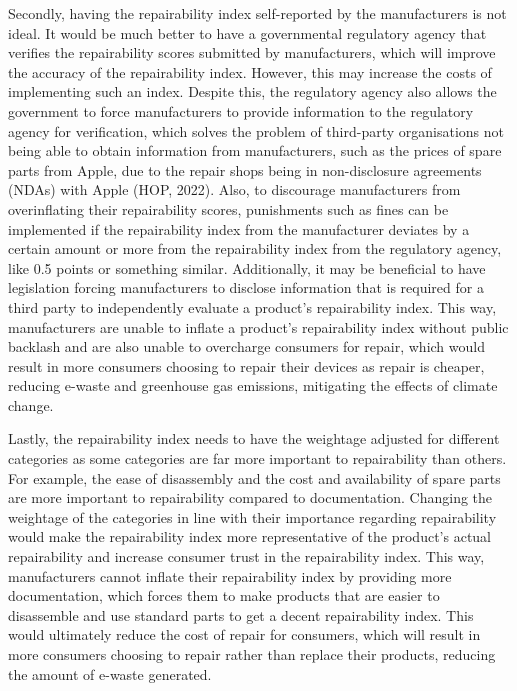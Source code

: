 \documentclass[11pt]{article}
\makeatletter
\newcommand{\citeprocitem}[2]{\hyper@linkstart{cite}{citeproc_bib_item_#1}#2\hyper@linkend}
\makeatother
\begin{document}
 \noindent Secondly, having the repairability index self-reported by the manufacturers is not ideal. It would be much better to have a governmental regulatory agency that verifies the repairability scores submitted by manufacturers, which will improve the accuracy of the repairability index. However, this may increase the costs of implementing such an index. Despite this, the regulatory agency also allows the government to force manufacturers to provide information to the regulatory agency for verification, which solves the problem of third-party organisations not being able to obtain information from manufacturers, such as the prices of spare parts from Apple, due to the repair shops being in non-disclosure agreements (NDAs) with Apple (\citeprocitem{11}{HOP, 2022}). Also, to discourage manufacturers from overinflating their repairability scores, punishments such as fines can be implemented if the repairability index from the manufacturer deviates by a certain amount or more from the repairability index from the regulatory agency, like 0.5 points or something similar. Additionally, it may be beneficial to have legislation forcing manufacturers to disclose information that is required for a third party to independently evaluate a product's repairability index. This way, manufacturers are unable to inflate a product's repairability index without public backlash and are also unable to overcharge consumers for repair, which would result in more consumers choosing to repair their devices as repair is cheaper, reducing e-waste and greenhouse gas emissions, mitigating the effects of climate change.

 \newpage

 \noindent Lastly, the repairability index needs to have the weightage adjusted for different categories as some categories are far more important to repairability than others. For example, the ease of disassembly and the cost and availability of spare parts are more important to repairability compared to documentation. Changing the weightage of the categories in line with their importance regarding repairability would make the repairability index more representative of the product's actual repairability and increase consumer trust in the repairability index. This way, manufacturers cannot inflate their repairability index by providing more documentation, which forces them to make products that are easier to disassemble and use standard parts to get a decent repairability index. This would ultimately reduce the cost of repair for consumers, which will result in more consumers choosing to repair rather than replace their products, reducing the amount of e-waste generated.
\end{document}
